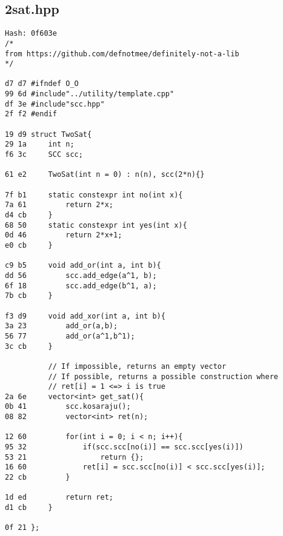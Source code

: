\documentclass[11pt, a4paper, twoside]{article}
\begin{document}
\subsection{2sat.hpp}
\begin{lstlisting}
Hash: 0f603e
/*
from https://github.com/defnotmee/definitely-not-a-lib
*/

d7 d7 #ifndef O_O
99 6d #include"../utility/template.cpp"
df 3e #include"scc.hpp"
2f f2 #endif

19 d9 struct TwoSat{
29 1a     int n;
f6 3c     SCC scc;
      
61 e2     TwoSat(int n = 0) : n(n), scc(2*n){}
      
7f b1     static constexpr int no(int x){
7a 61         return 2*x;
d4 cb     }
68 50     static constexpr int yes(int x){
0d 46         return 2*x+1;
e0 cb     }
      
c9 b5     void add_or(int a, int b){
dd 56         scc.add_edge(a^1, b);
6f 18         scc.add_edge(b^1, a);
7b cb     }
      
f3 d9     void add_xor(int a, int b){
3a 23         add_or(a,b);
56 77         add_or(a^1,b^1);
3c cb     }
      
          // If impossible, returns an empty vector
          // If possible, returns a possible construction where
          // ret[i] = 1 <=> i is true
2a 6e     vector<int> get_sat(){
0b 41         scc.kosaraju();
08 82         vector<int> ret(n);
      
12 60         for(int i = 0; i < n; i++){
95 32             if(scc.scc[no(i)] == scc.scc[yes(i)])
53 21                 return {};
16 60             ret[i] = scc.scc[no(i)] < scc.scc[yes(i)];
22 cb         }
      
1d ed         return ret;
d1 cb     }
      
0f 21 };
\end{lstlisting}
\end{document}
